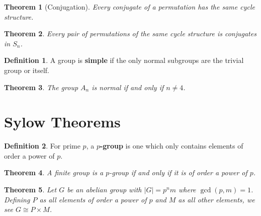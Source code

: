 \documentclass[
    parskip=half,
    toc=flat,
    toc=sectionentrydotfill,
]{scrartcl}  %
\theoremstyle{definition}
\newtheorem{definition}{Definition}[section]
\theoremstyle{plain}
\newtheorem{theorem}{Theorem}[section]
\theoremstyle{remark}
\begin{document}
\begin{theorem}[Conjugation]
    Every conjugate of a permutation has the same cycle structure.
\end{theorem}


\begin{theorem}
    Every pair of permutations of the same cycle structure is conjugates in $S_n$.
\end{theorem}

\begin{definition}
    A group is \textbf{simple} if the only normal subgroups are the trivial group or itself.
\end{definition}

\begin{theorem}
    The group $A_n$ is normal if and only if $n\neq 4$.
\end{theorem}



\section{Sylow Theorems}


\begin{definition}
    For prime $p$, a \textbf{$p$-group} is one which only contains elements of order a power of
    $p$.
\end{definition}

\begin{theorem}
    A finite group is a $p$-group if and only if it is of order a power of $p$.
\end{theorem}

\begin{theorem}
    Let $G$ be an abelian group with $|G|=p^nm$ where $\gcd(p,m)=1$.
    Defining $P$ as all elements of order a power of $p$ and $M$ as all other elements, we see
    $G\cong P\times M$.
\end{theorem}
\end{document}
